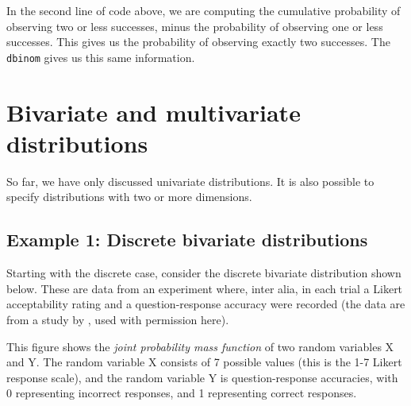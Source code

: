 \documentclass[12pt,]{krantz}
\newenvironment{Shaded}{\begin{snugshade}}{\end{snugshade}}
\newcommand{\KeywordTok}[1]{\textcolor[rgb]{0.13,0.29,0.53}{\textbf{#1}}}
\newcommand{\DataTypeTok}[1]{\textcolor[rgb]{0.13,0.29,0.53}{#1}}
\newcommand{\DecValTok}[1]{\textcolor[rgb]{0.00,0.00,0.81}{#1}}
\newcommand{\StringTok}[1]{\textcolor[rgb]{0.31,0.60,0.02}{#1}}
\newcommand{\OtherTok}[1]{\textcolor[rgb]{0.56,0.35,0.01}{#1}}
\newcommand{\OperatorTok}[1]{\textcolor[rgb]{0.81,0.36,0.00}{\textbf{#1}}}
\newcommand{\NormalTok}[1]{#1}
\theoremstyle{definition}
\theoremstyle{definition}
\theoremstyle{definition}
\theoremstyle{remark}
\begin{document}
In the second line of code above, we are computing the cumulative
probability of observing two or less successes, minus the probability of
observing one or less successes. This gives us the probability of
observing exactly two successes. The \texttt{dbinom} gives us this same
information.

\section{Bivariate and multivariate
distributions}\label{bivariate-and-multivariate-distributions}

So far, we have only discussed univariate distributions. It is also
possible to specify distributions with two or more dimensions.

\subsection{Example 1: Discrete bivariate
distributions}\label{example-1-discrete-bivariate-distributions}

Starting with the discrete case, consider the discrete bivariate
distribution shown below. These are data from an experiment where, inter
alia, in each trial a Likert acceptability rating and a
question-response accuracy were recorded (the data are from a study by
\citet{AnnaLphd}, used with permission here).

This figure shows the \emph{joint probability mass function} of two
random variables X and Y. The random variable X consists of 7 possible
values (this is the 1-7 Likert response scale), and the random variable
Y is question-response accuracies, with 0 representing incorrect
responses, and 1 representing correct responses.

\begin{Shaded}
\end{Shaded}
\end{document}
